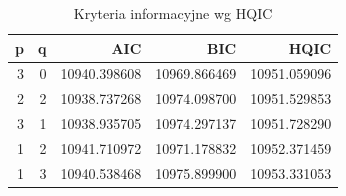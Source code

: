 \documentclass{article}
\theoremstyle{break}
\begin{document}
\begin{table}[H]
	\centering
	\begin{tabular}{|r|r|r|r|r|}
		\hline
		\rowcolor[HTML]{C0C0C0} 
		{\color[HTML]{111111} \textbf{p}} & {\color[HTML]{111111} \textbf{q}} & {\color[HTML]{111111} \textbf{AIC}} & {\color[HTML]{111111} \textbf{BIC}} & {\color[HTML]{111111} \textbf{HQIC}} \\ \hline
		{\color[HTML]{111111} 3}          & {\color[HTML]{111111} 0}          & {\color[HTML]{111111} 10940.398608} & {\color[HTML]{111111} 10969.866469} & {\color[HTML]{111111} 10951.059096}  \\ \hline
		{\color[HTML]{111111} 2}          & {\color[HTML]{111111} 2}          & {\color[HTML]{111111} 10938.737268} & {\color[HTML]{111111} 10974.098700} & {\color[HTML]{111111} 10951.529853}  \\ \hline
		{\color[HTML]{111111} 3}          & {\color[HTML]{111111} 1}          & {\color[HTML]{111111} 10938.935705} & {\color[HTML]{111111} 10974.297137} & {\color[HTML]{111111} 10951.728290}  \\ \hline
		{\color[HTML]{111111} 1}          & {\color[HTML]{111111} 2}          & {\color[HTML]{111111} 10941.710972} & {\color[HTML]{111111} 10971.178832} & {\color[HTML]{111111} 10952.371459}  \\ \hline
		{\color[HTML]{111111} 1}          & {\color[HTML]{111111} 3}          & {\color[HTML]{111111} 10940.538468} & {\color[HTML]{111111} 10975.899900} & {\color[HTML]{111111} 10953.331053}  \\ \hline
	\end{tabular}
\caption{Kryteria informacyjne wg HQIC}
\label{t3}
\end{table}
\end{document}
